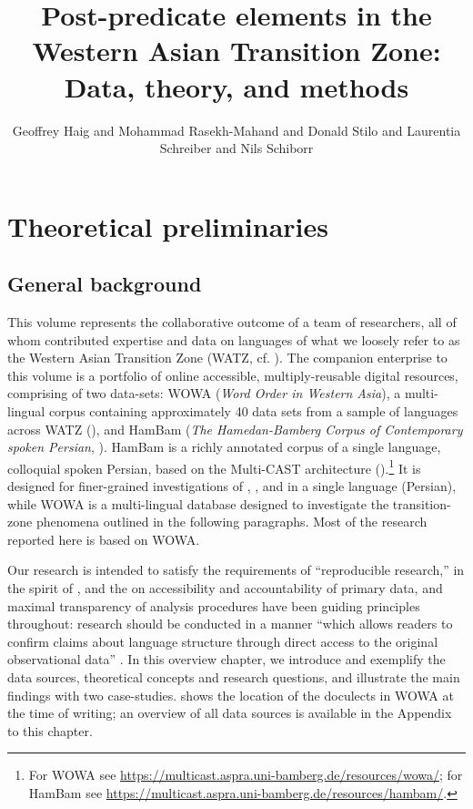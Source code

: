 \documentclass[output=paper,colorlinks,citecolor=brown,collectionchapter]{langscibook}
\author{Geoffrey Haig\orcid{0000-0002-5410-3692}\affiliation{University of Bamberg} and Mohammad Rasekh-Mahand\affiliation{Bu-Ali Sina University Hamedan} and Donald Stilo\affiliation{Max Planck Institute, Leipzig (retired)} and Laurentia Schreiber\orcid{0000-0002-0051-1164}\affiliation{University of Bamberg} and Nils Schiborr\affiliation{University of Bamberg}}
\title[Post-predicate elements in the Western Asian Transition Zone]{Post-predicate elements in the Western Asian Transition Zone: Data, theory, and methods}
\begin{document}
\maketitle\label{WOWA:ch:1}
\section{Theoretical preliminaries}\label{Intro:ss:1}

\subsection{General background}\label{Intro:ss:1.1}

This volume represents the collaborative outcome of a team of researchers, all of whom contributed expertise and data on languages of what we loosely refer to as the Western Asian Transition Zone (WATZ, cf. ). The companion enterprise to this volume is a portfolio of online accessible, multiply-reusable digital resources, comprising of two data-sets: WOWA  (\textit{Word Order in Western Asia}), a multi-lingual corpus containing approximately 40 data sets from a sample of languages across WATZ (\citealt{Haig.Stilo.Dogan.Schiborr2022}), and HamBam (\textit{The Hamedan-Bamberg Corpus of Contemporary spoken Persian}, \citealt{HaigRasekhMahand2022HamBam}). HamBam is a richly annotated corpus of a single language, colloquial spoken Persian, based on the Multi-CAST architecture (\citealt{haig_verb-goal_2015,Schnell2023are}).\footnote{For WOWA see \url{https://multicast.aspra.uni-bamberg.de/resources/wowa/}; for HamBam see \url{https://multicast.aspra.uni-bamberg.de/resources/hambam/}.} It is designed for finer-grained investigations of , , and  in a single language (Persian), while WOWA is a multi-lingual database designed to investigate the transition-zone phenomena outlined in the following paragraphs. Most of the research reported here is based on WOWA.

\largerpage

Our research is intended to satisfy the requirements of ``reproducible research,'' in the spirit of \citet{berez-kroeker_reproducible_2018}, and the  on accessibility and accountability of primary data, and maximal transparency of analysis procedures have been guiding principles throughout: research should be conducted in a manner ``which allows readers to confirm claims about language structure through direct access to the original observational data'' \citep[6]{berez-kroeker_reproducible_2018}. In this overview chapter, we introduce and exemplify the data sources, theoretical concepts and research questions, and illustrate the main findings with two case-studies.  shows the location of the doculects in WOWA at the time of writing; an overview of all data sources is available in the Appendix to this chapter.
\end{document}
